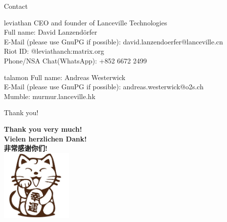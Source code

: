 \documentclass[9pt]{beamer}
\begin{document}
\begin{frame}{Contact}
	\begin{block}{leviathan}
		CEO and founder of Lanceville Technologies \\
		Full name: David Lanzendörfer \\
		E-Mail (please use GnuPG if possible): david.lanzendoerfer@lanceville.cn \\
		Riot ID: @leviathanch:matrix.org \\
		Phone/NSA Chat(WhatsApp): +852 6672 2499		
	\end{block}
	\begin{block}{talamon}
		Full name: Andreas Westerwick \\
		E-Mail (please use GnuPG if possible): andreas.westerwick@o2s.ch \\
		Mumble: murmur.lanceville.hk
	\end{block}
\end{frame}

\begin{frame}{Thank you!}
	\begin{center}
		\textbf{Thank you very much!} \\
		\textbf{Vielen herzlichen Dank!} \\
		\textbf{\cjkfont 非常感谢你们!} \\
		\includegraphics[width=100pt]{cat.png}
	\end{center}
\end{frame}
\end{document}

